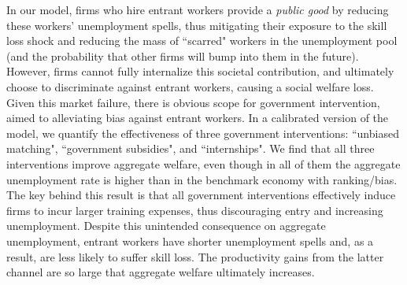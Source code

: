\documentclass[12pt]{article} %
\theoremstyle{definition}
\begin{document}
 
 
In our model,  
firms who hire entrant workers provide a \textit{public good} by reducing these workers' unemployment spells, thus mitigating their exposure to the skill loss shock and reducing the mass of ``scarred" workers in the unemployment pool (and the probability that other firms will bump into them in the future). However, firms cannot fully internalize this societal contribution, and ultimately choose to discriminate against entrant workers, causing a social welfare loss. Given this market failure, there is obvious scope for government intervention, aimed to 
alleviating bias against entrant workers. In a calibrated version of the model, we quantify the effectiveness of three government interventions: ``unbiased matching", ``government subsidies", and ``internships". We find that all three interventions improve aggregate welfare, even though in all of them the aggregate unemployment rate is higher than in the benchmark economy with ranking/bias. The key behind this result is that all government interventions effectively induce firms to incur larger training expenses, thus discouraging entry and increasing unemployment. Despite this unintended consequence on aggregate unemployment, entrant workers have shorter unemployment spells and, as a result, are less likely to suffer skill loss. The productivity gains from the latter channel are so large that aggregate welfare ultimately increases. 
\end{document}
